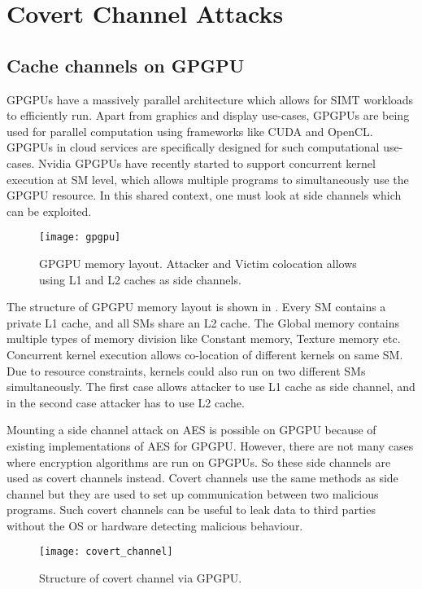 \chapter{Covert Channel Attacks}

\section{Cache channels on GPGPU}

GPGPUs have a massively parallel architecture which allows for SIMT workloads
to efficiently run. Apart from graphics and display use-cases, GPGPUs are
being used for parallel computation using frameworks like CUDA and OpenCL.
GPGPUs in cloud services are specifically designed for such computational
use-cases. Nvidia GPGPUs have recently started to support concurrent kernel
execution at SM level, which allows multiple programs to simultaneously use
the GPGPU resource. In this shared context, one must look at side channels
which can be exploited.

\begin{figure}[h]
\centering
\texttt{[image: gpgpu]}
\caption[Memory layout of GPGPU]{GPGPU memory layout.
Attacker and Victim colocation allows using L1 and L2 caches as side channels.}
\label{fig:gpgpu}
\end{figure}

The structure of GPGPU memory layout is shown in . Every SM
contains a private L1 cache, and all SMs share an L2 cache. The Global memory
contains multiple types of memory division like Constant memory, Texture
memory etc. Concurrent kernel execution allows co-location of different
kernels on same SM. Due to resource constraints, kernels could also run on two
different SMs simultaneously. The first case allows attacker to use L1 cache
as side channel, and in the second case attacker has to use L2 cache.

Mounting a side channel attack on AES is possible on GPGPU because of existing
implementations of AES for GPGPU. However, there are not many cases where
encryption algorithms are run on GPGPUs. So these side channels are used as
covert channels instead. Covert channels use the same methods as side channel
but they are used to set up communication between two malicious programs. Such
covert channels can be useful to leak data to third parties without the OS or
hardware detecting malicious behaviour.

\begin{figure}[h]
\centering
\texttt{[image: covert\_channel]}
\caption[Covert channel on GPGPU]{Structure of covert channel via GPGPU.}
\label{fig:gpgpu}
\end{figure}

